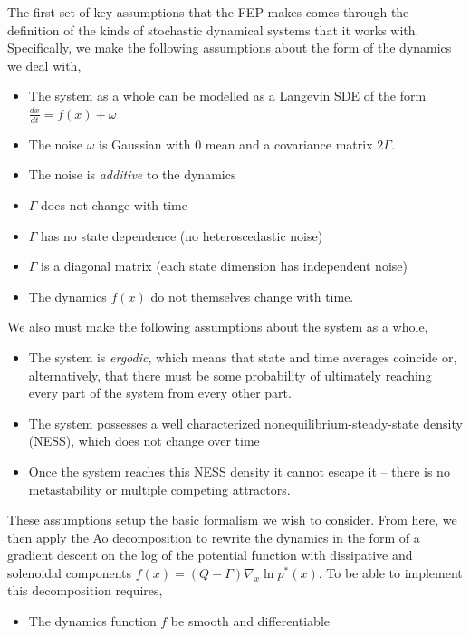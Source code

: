 The first set of key assumptions that the FEP makes comes through the definition of the kinds of stochastic dynamical systems that it works with. Specifically, we make the following assumptions about the form of the dynamics we deal with,
\begin{itemize}
  \item The system as a whole can be modelled as a Langevin SDE of the form $\frac{dx}{dt} = f(x) + \omega$
  \item The noise $\omega$ is Gaussian with 0 mean and a covariance matrix $2\Gamma$.
  \item The noise is \emph{additive} to the dynamics
  \item $\Gamma$ does not change with time
  \item $\Gamma$ has no state dependence (no heteroscedastic noise)
  \item $\Gamma$ is a diagonal matrix (each state dimension has independent noise)
  \item The dynamics $f(x)$ do not themselves change with time.
\end{itemize}
We also must make the following assumptions about the system as a whole,
\begin{itemize}
  \item The system is \emph{ergodic}, which means that state and time averages coincide or, alternatively, that there must be some probability of ultimately reaching every part of the system from every other part.
  \item The system possesses a well characterized nonequilibrium-steady-state density (NESS), which does not change over time
  \item Once the system reaches this NESS density it cannot escape it -- there is no metastability or multiple competing attractors.
\end{itemize}
These assumptions setup the basic formalism we wish to consider. From here, we then apply the Ao decomposition to rewrite the dynamics in the form of a gradient descent on the log of the potential function with dissipative and solenoidal components $f(x)= (Q - \Gamma)\nabla_x \ln p^*(x)$. To be able to implement this decomposition requires,
\begin{itemize}
  \item The dynamics function $f$ be smooth and differentiable
\end{itemize}

